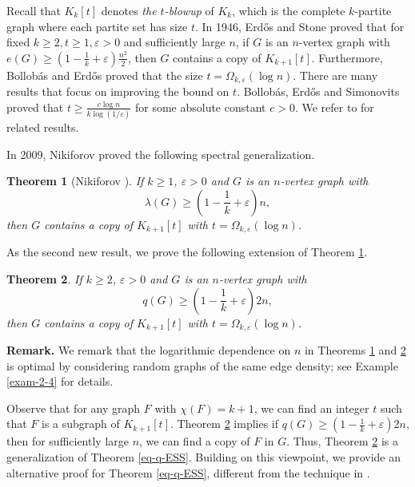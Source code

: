 \documentclass[11pt,a4paper]{article}
\theoremstyle{plain}
\newtheorem{theorem}{Theorem}[section]
\theoremstyle{definition}
\begin{document}
Recall that $K_{k}[t]$ denotes 
{\it the $t$-blowup} of $K_k$, which is 
the complete $k$-partite graph where each partite set has size $t$.  
In 1946, Erd\H{o}s and Stone \cite{ES1946} proved that for fixed $k\ge 2, t\ge 1,  \varepsilon >0$ and sufficiently large $n$, if $G$ is an $n$-vertex graph with $e(G)\ge (1- \frac{1}{k} + \varepsilon) \frac{n^2}{2}$, then $G$ contains a copy of $K_{k+1}[t]$. Furthermore, 
Bollob\'as and Erd\H{o}s \cite{BE1973} proved that the size $t=\Omega_{k,\varepsilon}(\log n)$. 
There are many results that focus on improving the bound on $t$. Bollob\'{a}s, Erd\H{o}s and Simonovits \cite{BES1976} 
proved that $t\ge \frac{c \log n}{k \log (1/\varepsilon)}$ for some absolute constant $c >0$.  
We refer to \cite{CS1981,BK1994,Ish2002} for related results. 


In 2009, Nikiforov \cite{ESB2009} proved the following spectral generalization. 



\begin{theorem}[Nikiforov \cite{ESB2009}]\label{sES}
If $k\geq 1$, $\varepsilon >0$ and $G$ is an $n$-vertex graph with 
\[ \lambda(G)\geq \left(1-\frac{1}{k}+\varepsilon \right)n, \]  
then $G$ contains a copy of $K_{k+1}[t]$ with $t=\Omega_{k,\varepsilon} (\log n)$.
\end{theorem}

 
As the second new result, we prove the following extension of Theorem \ref{sES}. 


\begin{theorem}\label{lsES}
If $k\geq 2$, $\varepsilon >0$ and $G$ is an $n$-vertex graph with 
\[ q(G)\geq \left(1-\frac{1}{k} 
+\varepsilon \right)2n, \]  
then $G$ contains a copy of $K_{k+1}[t]$ with $t=\Omega_{k,\varepsilon} (\log n)$.
\end{theorem} 


\noindent 
{\bf Remark.}
We remark that 
the logarithmic dependence on $n$ in Theorems \ref{sES} and \ref{lsES} is optimal by considering random graphs of the same edge density; see Example \ref{exam-2-4} for details.

 


Observe that for any graph $F$ with $\chi (F)=k+1$, we can find an integer $t$ such that 
$F$ is a subgraph of $K_{k+1}[t]$. 
Theorem \ref{lsES} implies if $q(G)\ge (1- \frac{1}{k} + \varepsilon)2n$, then for sufficiently large $n$, we can find a copy of $F$ in $G$. Thus, Theorem \ref{lsES} is a generalization of Theorem \ref{eq-q-ESS}. 
Building on this viewpoint, we provide an alternative proof for Theorem \ref{eq-q-ESS}, different from the technique in \cite{ZLS2025}. 
\end{document}
